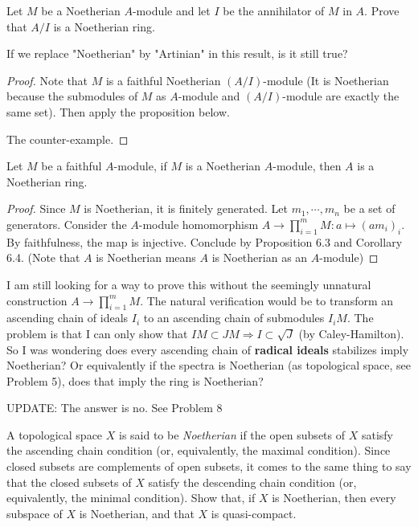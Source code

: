 \documentclass{solution}
\begin{document}
\begin{problem}
    Let $M$ be a Noetherian $A$-module and let $I$ be the annihilator of $M$ in $A$. Prove that $A / I$ is a Noetherian ring.

    If we replace "Noetherian" by "Artinian" in this result, is it still true?
\end{problem}

\begin{proof}
    Note that $M$ is a faithful Noetherian $(A / I)$-module (It is Noetherian because the submodules of $M$ as $A$-module and $(A / I)$-module are exactly the same set). Then apply the proposition below.

    \TODO The counter-example.
\end{proof}

\begin{proposition}
    Let $M$ be a faithful $A$-module, if $M$ is a Noetherian $A$-module, then $A$ is a Noetherian ring.
\end{proposition}

\begin{proof}
    Since $M$ is Noetherian, it is finitely generated. Let $m_1, \cdots, m_n$ be a set of generators. Consider the $A$-module homomorphism $A \rightarrow \prod\limits_{i = 1}^{m}M: a \mapsto (am_i)_i$. By faithfulness, the map is injective. Conclude by Proposition 6.3 and Corollary 6.4. (Note that $A$ is Noetherian means $A$ is Noetherian as an $A$-module)
\end{proof}

{\color{red}
    \TODO I am still looking for a way to prove this without the seemingly unnatural construction $A \rightarrow \prod\limits_{i = 1}^{m} M$. The natural verification would be to transform an ascending chain of ideals $I_i$ to an ascending chain of submodules $I_iM$. The problem is that I can only show that $IM \subset JM \Rightarrow I \subset \sqrt{J}$ (by Caley-Hamilton). So I was wondering does every ascending chain of \textbf{radical ideals} stabilizes imply Noetherian? Or equivalently if the spectra is Noetherian (as topological space, see Problem 5), does that imply the ring is Noetherian?

    UPDATE: The answer is no. See Problem 8
}

\begin{problem}
    A topological space $X$ is said to be \textit{Noetherian} if the open subsets of $X$ satisfy the ascending chain condition (or, equivalently, the maximal condition). Since closed subsets are complements of open subsets, it comes to the same thing to say that the closed subsets of $X$ satisfy the descending chain condition (or, equivalently, the minimal condition). Show that, if $X$ is Noetherian, then every subspace of $X$ is Noetherian, and that $X$ is quasi-compact.
\end{problem}
\end{document}
